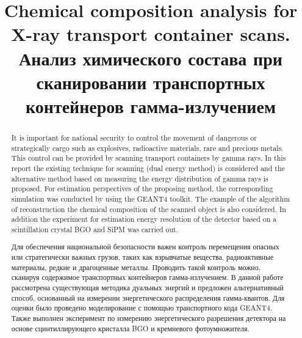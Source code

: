 \documentclass[a4paper]{panl}
\begin{document}
\title{Chemical composition analysis for X-ray transport container scans.  \\ Анализ химического состава при сканировании транспортных контейнеров гамма-излучением}
\maketitle
{}
\vspace{-3mm}

\begin{abstract}
It is important for national security to control the movement of dangerous or strategically cargo such as explosives, radioactive materials, rare and precious metals. This control can be provided by scanning transport containers by gamma rays.
In this report the existing technique for scanning (dual energy method) is considered and the alternative method based on measuring the energy distribution of gamma rays is proposed. For estimation perspectives of the proposing method, the  corresponding simulation was conducted by using the GEANT4 toolkit. The example of the algorithm of reconstruction the chemical composition of the scanned object is also considered. In addition the experiment for estimation energy resolution of the detector based on a scintillation crystal BGO and SiPM was carried out.\\
\vspace{0.2cm}

Для обеспечения национальной безопасности важен контроль перемещения опасных или стратегически важных грузов, таких как взрывчатые вещества, радиоактивные материалы, редкие и драгоценные металлы. Проводить такой контроль можно, сканируя содержимое транспортных контейнеров гамма-излучением. В данной работе рассмотрена существующая методика дуальных энергий и предложен альтернативный способ, основанный на измерении энергетического распределения гамма-квантов. Для оценки было проведено моделирование с помощью транспортного кода GEANT4.  Также выполнен эксперимент по измерению энергетического разрешения детектора на основе сцинтиллирующего кристалла BGO и кремневого фотоумножителя. 
\end{abstract}
\vspace*{6pt}
\end{document}
